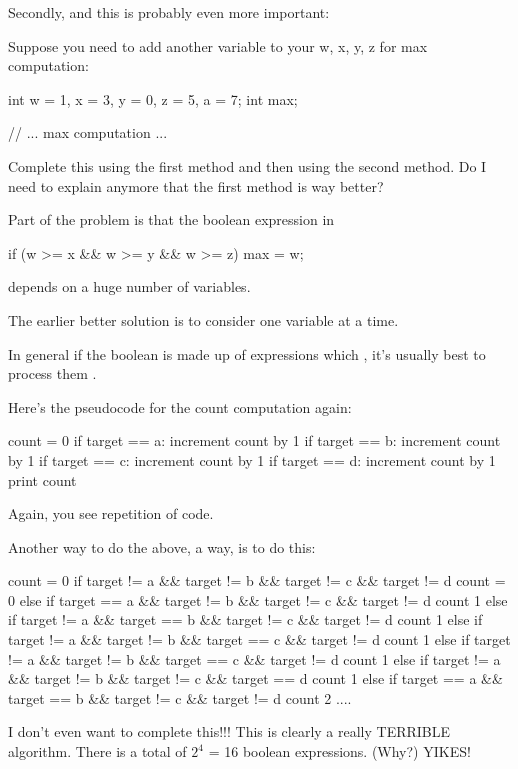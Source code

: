 Secondly, and this is probably even more important:

\begin{ex}
Suppose you need to add another variable to your w,
x, y, z for max computation:
\begin{console}
int w = 1, x = 3, y = 0, z = 5, a = 7;
int max;

// ... max computation ... 
\end{console}
\end{ex}
Complete this using the first method and then using the second method.
Do I need to explain anymore that the first method is way better?

Part of the problem is that the boolean expression in
\begin{console}
if (w >= x && w >= y && w >= z)
    max = w;  
\end{console}
depends on a huge number of variables.

The earlier better solution is to consider one variable at a time.

In general if the boolean is made up of expressions which , it's usually best to process them .

\newpage{}

Here's the pseudocode for the count computation again:
\begin{console}
count = 0
if target == a:
   increment count by 1
if target == b:
   increment count by 1
if target == c:
   increment count by 1
if target == d:
   increment count by 1
print count 
\end{console}
Again, you see repetition of code.

Another way to do the above, a  way, is to do this:
\begin{console}
count = 0
if target != a && target != b && target != c && target != d
   count = 0
else if target == a && target != b && target != c && target != d
   count 1
else if target != a && target == b && target != c && target != d
   count 1
else if target != a && target != b && target == c && target != d
   count 1
else if target != a && target != b && target == c && target != d
   count 1
else if target != a && target != b && target != c && target == d
   count 1
else if target == a && target == b && target != c && target != d
   count 2
.... 
\end{console}

I don't even want to complete this!!! This is clearly a really TERRIBLE
algorithm. There is a total of $2^4$ = 16 boolean
expressions. (Why?) YIKES!

